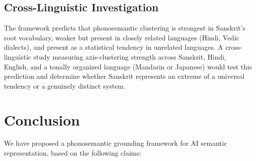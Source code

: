 \documentclass[12pt]{article}
\begin{document}
\subsection{Cross-Linguistic Investigation}

The framework predicts that phonosemantic clustering is strongest in Sanskrit's root vocabulary, weaker but present in closely related languages (Hindi, Vedic dialects), and present as a statistical tendency in unrelated languages. A cross-linguistic study measuring axis-clustering strength across Sanskrit, Hindi, English, and a tonally organized language (Mandarin or Japanese) would test this prediction and determine whether Sanskrit represents an extreme of a universal tendency or a genuinely distinct system.


\section{Conclusion}

We have proposed a phonosemantic grounding framework for AI semantic representation, based on the following claims:
\end{document}

